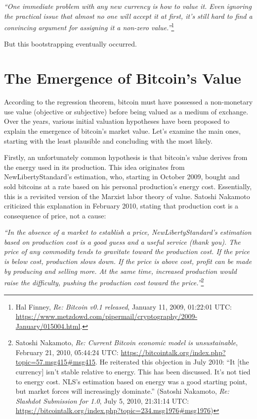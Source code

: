 \documentclass[
  a5paper,
  smalldemyvopaper,10pt,twoside,onecolumn,openright,extrafontsizes,hidelinks]{memoir}
\begin{document}
\emph{``One immediate problem with any new currency is how to value it.
Even ignoring the practical issue that almost no one will accept it at
first, it's still hard to find a convincing argument for assigning it a
non-zero value.''}\footnote{Hal Finney, \emph{Re: Bitcoin v0.1
  released}, January 11, 2009, 01:22:01 UTC:
  \url{https://www.metzdowd.com/pipermail/cryptography/2009-January/015004.html}.}

But this bootstrapping eventually occurred.

\section*{The Emergence of Bitcoin's
Value}\label{lemergence-de-la-valeur-du-bitcoin}


According to the regression theorem, bitcoin must have possessed a
non-monetary use value (objective or subjective) before being valued as
a medium of exchange. Over the years, various initial valuation
hypotheses have been proposed to explain the emergence of bitcoin's
market value. Let's examine the main ones, starting with the least
plausible and concluding with the most likely.

Firstly, an unfortunately common hypothesis is that bitcoin's value
derives from the energy used in its production. This idea originates
from NewLibertyStandard's estimation, who, starting in October 2009,
bought and sold bitcoins at a rate based on his personal production's
energy cost. Essentially, this is a revisited version of the Marxist
labor theory of value. Satoshi Nakamoto criticized this explanation in
February 2010, stating that production cost is a consequence of price,
not a cause:

\emph{``In the absence of a market to establish a price,
NewLibertyStandard's estimation based on production cost is a good guess
and a useful service (thank you). The price of any commodity tends to
gravitate toward the production cost. If the price is below cost,
production slows down. If the price is above cost, profit can be made by
producing and selling more. At the same time, increased production would
raise the difficulty, pushing the production cost toward the
price.''}\footnote{Satoshi Nakamoto, \emph{Re: Current Bitcoin economic
  model is unsustainable}, February 21, 2010, 05:44:24 UTC:
  \url{https://bitcointalk.org/index.php?topic=57.msg415\#msg415}. He
  reiterated this objection in July 2010: ``It {[}the currency{]} isn't
  stable relative to energy. This has been discussed. It's not tied to
  energy cost. NLS's estimation based on energy was a good starting
  point, but market forces will increasingly dominate.'' (Satoshi
  Nakamoto, \emph{Re: Slashdot Submission for 1.0}, July 5, 2010,
  21:31:14 UTC:
  \url{https://bitcointalk.org/index.php?topic=234.msg1976\#msg1976})}
\end{document}
